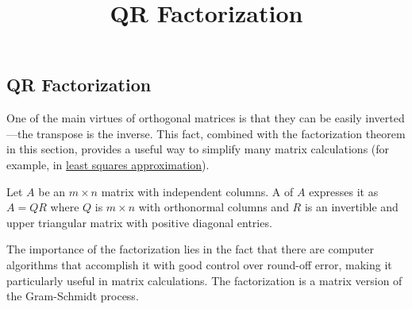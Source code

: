 \documentclass{ximera}
\title{QR Factorization} \license{CC BY-NC-SA 4.0}
\begin{document}
\begin{abstract}

\end{abstract}
\maketitle

\begin{onlineOnly}
\section*{QR Factorization}
\end{onlineOnly}

One of the main virtues of orthogonal
matrices is that they can be easily inverted---the transpose is the
inverse. This fact, combined with the factorization theorem in this
section, provides a useful way to simplify many matrix calculations (for
 example, in \href{https://ximera.osu.edu/linearalgebradzv3/LinearAlgebraInteractiveIntro/RTH-0030/main}{least squares approximation}).


\begin{definition}\label{def:QR-factorization}
Let $A$ be an $m \times n$ matrix with independent columns. A  of $A$ expresses it as $A = QR$ where $Q$ is $m \times n$ with orthonormal columns and $R$ is an invertible and upper triangular matrix with positive diagonal entries.
\end{definition}

The importance of the factorization
lies in the fact that there are computer algorithms that accomplish it
with good control over round-off error, making it particularly useful in
 matrix calculations. The factorization is a matrix version of the Gram-Schmidt process.
\end{document}
